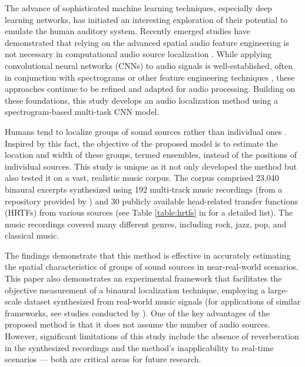 \documentclass[11pt]{article}
\begin{document}
The advance of sophisticated machine learning techniques, especially deep learning networks, has initiated an interesting exploration of their potential to emulate the human auditory system. Recently emerged studies have demonstrated that relying on the advanced spatial audio feature engineering is not necessary in computational audio source localization \parencite{vera-diaz_towards_2018, pang_multitask_2019, yang_deepear_2022}. While applying convolutional neural networks (CNNs) \parencite{lecun_handwritten_1989} to audio signals is well-established, often in conjunction with spectrograms \parencite{thomas_analyzing_2014, espi_exploiting_2015, han_convolutional_2017} or other feature engineering techniques \parencite{abdel-hamid_applying_2012, sainath_deep_2013}, these approaches continue to be refined and adapted for audio processing. Building on these foundations, this study develops an audio localization method using a spectrogram-based multi-task CNN model.

Humans tend to localize groups of sound sources rather than individual ones \parencite{bregman_auditory_1990, rumsey_spatial_2002}. Inspired by this fact, the objective of the proposed model is to estimate the location and width of these groups, termed ensembles, instead of the positions of individual sources. This study is unique as it not only developed the method but also tested it on a vast, realistic music corpus. The corpus comprised 23,040 binaural excerpts synthesized using 192 multi-track music recordings (from a repository provided by \textcite{senior_mixing_2023}) and 30 publicly available head-related transfer functions (HRTFs) from various sources (see Table \ref{table:hrtfs} in  for a detailed list). The music recordings covered many different genres, including rock, jazz, pop, and classical music.

The findings demonstrate that this method is effective in accurately estimating the spatial characteristics of groups of sound sources in near-real-world scenarios. This paper also demonstrates an experimental framework that facilitates the objective measurement of a binaural localization technique, employing a large-scale dataset synthesized from real-world music signals (for applications of similar frameworks, see studies conducted by \textcite{antoniuk_blind_2023, zielinski_automatic_2022, zielinski_spatial_2022, zielinski_comparison_2020}). One of the key advantages of the proposed method is that it does not assume the number of audio sources. However, significant limitations of this study include the absence of reverberation in the synthesized recordings and the method's inapplicability to real-time scenarios --- both are critical areas for future research.
\end{document}
